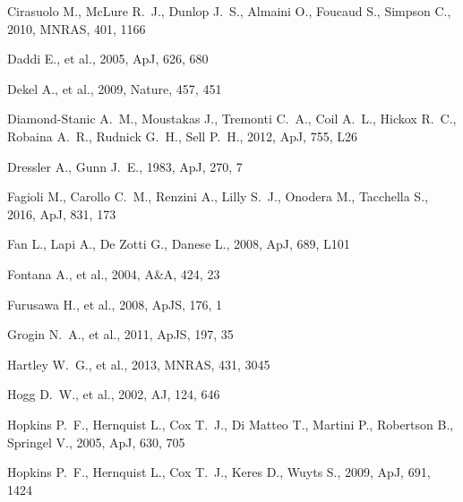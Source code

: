 \documentclass[a4paper,fleqn,usenatbib,useAMS]{mnras}
\begin{document}
\begin{thebibliography}{}
 Cirasuolo M., McLure R.~J., Dunlop J.~S., 
Almaini O., Foucaud S., Simpson C., 2010, MNRAS, 401, 1166 



Daddi E., et al., 2005, ApJ, 626, 680 


Dekel A., et al., 2009, Nature, 457, 451 


 Diamond-Stanic A.~M., Moustakas J., 
Tremonti C.~A., Coil A.~L., Hickox R.~C., Robaina A.~R., Rudnick G.~H., 
Sell P.~H., 2012, ApJ, 755, L26 


 Dressler A., Gunn J.~E., 1983, ApJ, 270, 7 



 Fagioli M., Carollo C.~M.,
  Renzini A., Lilly S.~J., Onodera M., Tacchella S., 2016, ApJ, 831,
  173



 Fan L., Lapi A., De Zotti G., Danese L., 2008, ApJ, 689, L101 


 Fontana A., et al., 2004, A\&A, 424, 23 


 Furusawa H., et al., 2008, ApJS, 176, 1 



Grogin N.~A., et al., 2011, ApJS, 197, 35 


 Hartley W.~G., et al., 2013, MNRAS, 431, 
3045 


Hogg D.~W., et al., 2002, AJ, 124, 646 


 Hopkins P.~F., Hernquist L., Cox T.~J., Di 
Matteo T., Martini P., Robertson B., Springel V., 2005, ApJ, 630, 705 


 Hopkins P.~F., Hernquist L., Cox T.~J., 
Keres D., Wuyts S., 2009, ApJ, 691, 1424 




\end{thebibliography}
\end{document}
